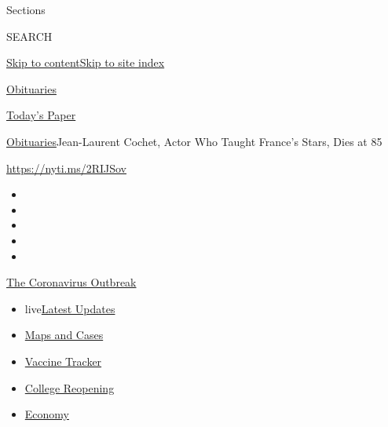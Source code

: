 Sections

SEARCH

\protect\hyperlink{site-content}{Skip to
content}\protect\hyperlink{site-index}{Skip to site index}

\href{https://www.nytimes.com/section/obituaries}{Obituaries}

\href{https://myaccount.nytimes.com/auth/login?response_type=cookie\&client_id=vi}{}

\href{https://www.nytimes.com/section/todayspaper}{Today's Paper}

\href{/section/obituaries}{Obituaries}\textbar{}Jean-Laurent Cochet,
Actor Who Taught France's Stars, Dies at 85

\url{https://nyti.ms/2RIJSov}

\begin{itemize}
\item
\item
\item
\item
\item
\end{itemize}

\href{https://www.nytimes.com/news-event/coronavirus?action=click\&pgtype=Article\&state=default\&region=TOP_BANNER\&context=storylines_menu}{The
Coronavirus Outbreak}

\begin{itemize}
\tightlist
\item
  live\href{https://www.nytimes.com/2020/08/03/world/coronavirus-covid-19.html?action=click\&pgtype=Article\&state=default\&region=TOP_BANNER\&context=storylines_menu}{Latest
  Updates}
\item
  \href{https://www.nytimes.com/interactive/2020/us/coronavirus-us-cases.html?action=click\&pgtype=Article\&state=default\&region=TOP_BANNER\&context=storylines_menu}{Maps
  and Cases}
\item
  \href{https://www.nytimes.com/interactive/2020/science/coronavirus-vaccine-tracker.html?action=click\&pgtype=Article\&state=default\&region=TOP_BANNER\&context=storylines_menu}{Vaccine
  Tracker}
\item
  \href{https://www.nytimes.com/2020/08/02/us/covid-college-reopening.html?action=click\&pgtype=Article\&state=default\&region=TOP_BANNER\&context=storylines_menu}{College
  Reopening}
\item
  \href{https://www.nytimes.com/live/2020/08/03/business/stock-market-today-coronavirus?action=click\&pgtype=Article\&state=default\&region=TOP_BANNER\&context=storylines_menu}{Economy}
\end{itemize}

